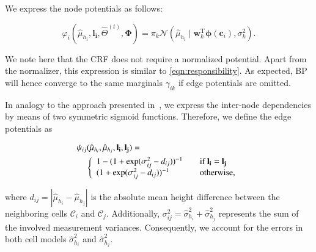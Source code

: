 We express the node potentials as follows:

\begin{equation}
\label{eqn:node_potential}
\varphi_i(\hat{\mu}_{h_i},\mathbf{l_i},\hat{\Theta}^{(t)},\boldsymbol{\Phi})=
\pi_k\mathcal{N}(\hat{\mu}_{h_i}\mid\mathbf{w}_k^\text{T}
\boldsymbol{\phi}(\mathbf{c}_i),\sigma^2_k).
\end{equation}

We note here that the CRF does not require a normalized potential. Apart from
the normalizer, this expression is similar to \eqref{eqn:responsibility}. As
expected, BP will hence converge to the same marginals $\gamma_{ik}$ if edge
potentials are omitted.

In analogy to the approach presented in~\cite{siegemund10curb}, we express the
inter-node dependencies by means of two symmetric sigmoid functions. Therefore,
we define the edge potentials as

\begin{eqnarray}
\label{eqn:edge_potential}
\psi_{ij}(\hat{\mu}_{h_i},\hat{\mu}_{h_j},\mathbf{l_i},\mathbf{l_j})=
\phantom{aaaaaaaaaaaaaaaaaaaaaaa}\\\nonumber
\left\{
\begin{array}{l l}
1-(1+\exp(\sigma^2_{ij}-d_{ij}))^{-1} & \quad
\text{if $\mathbf{l_i}=\mathbf{l_j}$}\\
(1+\exp(\sigma^2_{ij}-d_{ij}))^{-1} & \quad
\text{otherwise},
\end{array} \right.
\end{eqnarray}

where $d_{ij}=|\hat{\mu}_{h_i}-\hat{\mu}_{h_j}|$ is the absolute mean height
difference between the neighboring cells $\mathcal{C}_i$ and $\mathcal{C}_j$.
Additionally, $\sigma^2_{ij}=\hat{\sigma}^2_{h_i}+\hat{\sigma}^2_{h_j}$
represents the sum of the involved measurement variances. Consequently, we
account for the errors in both cell models $\hat{\sigma}^2_{h_i}$ and
$\hat{\sigma}^2_{h_j}$.
